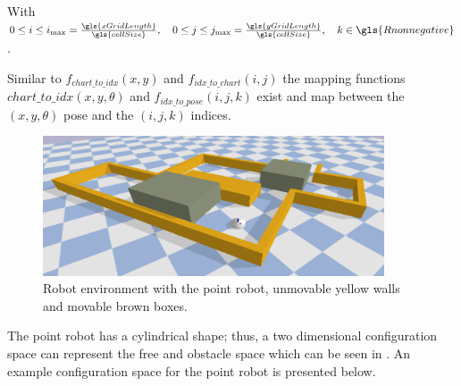 With $0 \leq i \leq i_{\textrm{max}} = \frac{\gls{xGridLength}}{\gls{cellSize}}, \quad 0 \leq j \leq j_{\textrm{max}} = \frac{\gls{yGridLength}}{\gls{cellSize}}, \quad k \in \gls{Rnonnegative}$.\bs

Similar to $f_\mathit{chart\_to\_idx}(x, y)$ and $f_\mathit{idx\_to\_chart}(i,j)$ the mapping functions $\mathit{chart\_to\_idx}(x, y, \theta)$ and $f_\mathit{idx\_to\_pose}(i, j, k)$ exist and map between the $(x, y, \theta)$ pose and the $(i, j, k)$ indices.\bs

\begin{figure}[H]
    \centering
    \includegraphics[width=0.9\textwidth]{figures/required_background/planning/two_push_to_freedom_env}
    \caption{Robot environment with the point robot, unmovable yellow walls and movable brown boxes.}%
    \label{fig:two_pushes_to_freedom_env}
\end{figure}

The point robot has a cylindrical shape; thus, a two dimensional configuration space can represent the free and obstacle space which can be seen in . An example configuration space for the point robot is presented below.

